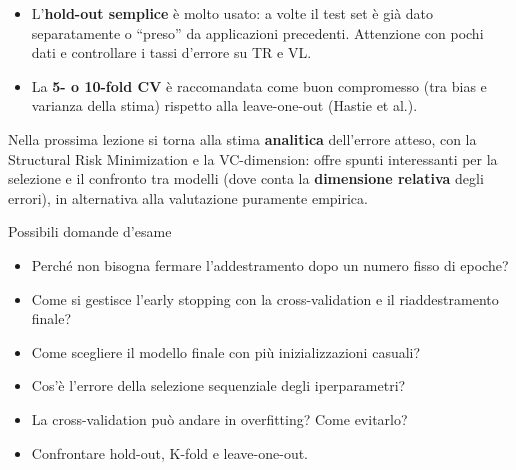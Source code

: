 \begin{itemize}
\tightlist
\item
  L'\textbf{hold-out semplice} è molto usato: a volte il test set è già
  dato separatamente o ``preso'' da applicazioni precedenti. Attenzione
  con pochi dati e controllare i tassi d'errore su TR e VL.
\item
  La \textbf{5- o 10-fold CV} è raccomandata come buon compromesso (tra
  bias e varianza della stima) rispetto alla leave-one-out (Hastie et
  al.).
\end{itemize}

Nella prossima lezione si torna alla stima \textbf{analitica}
dell'errore atteso, con la Structural Risk Minimization e la
VC-dimension: offre spunti interessanti per la selezione e il confronto
tra modelli (dove conta la \textbf{dimensione relativa} degli errori),
in alternativa alla valutazione puramente empirica.

\begin{boxquestion}{Possibili domande d'esame}

\begin{itemize}
\tightlist
\item
  Perché non bisogna fermare l'addestramento dopo un numero fisso di
  epoche?
\item
  Come si gestisce l'early stopping con la cross-validation e il
  riaddestramento finale?
\item
  Come scegliere il modello finale con più inizializzazioni casuali?
\item
  Cos'è l'errore della selezione sequenziale degli iperparametri?
\item
  La cross-validation può andare in overfitting? Come evitarlo?
\item
  Confrontare hold-out, K-fold e leave-one-out.
\end{itemize}

\end{boxquestion}
